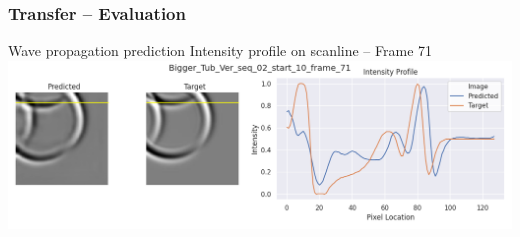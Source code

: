 \begin{frame}
    \frametitle{Transfer -- Evaluation}

Wave propagation prediction \newline
Intensity profile on scanline -- Frame 71\\[\baselineskip]

\includegraphics[width=\textwidth, height=.55\textheight]{./Ressourcen/Praesentation/Bilder/WaveTransfer/DFP/Bigger_Tub_Ver_seq_02_start_10_frame_71.png}%

\end{frame}
\clearpage
